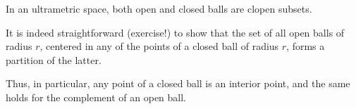 \documentclass[12pt]{article}
\begin{document}
In an ultrametric space, both open and closed balls are clopen subsets.

It is indeed straightforward (exercise!) to show that the set of all open balls of radius $r$, 
centered in any of the points of a closed ball of radius $r$, forms a partition of the latter.

Thus, in particular, any point of a closed ball is an interior point,
and the same holds for the complement of an open ball.



\end{document}
